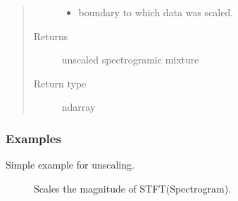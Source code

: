 \documentclass[letterpaper,10pt,english,openany,oneside]{sphinxmanual}
\begin{document}
\begin{fulllineitems}
\begin{fulllineitems}
\begin{quote}
\begin{description}
\begin{itemize}
\item {} 
 \textendash{} boundary to which data was scaled.

\end{itemize}

\item[{Returns}] \leavevmode
unscaled spectrogramic mixture

\item[{Return type}] \leavevmode
ndarray

\end{description}\end{quote}
\subsubsection*{Examples}

Simple example for unscaling.

\begin{sphinxVerbatim}[commandchars=\\\{\}]
  \PYG{p}{[}\PYG{p}{[}    \PYG{p}{]} \PYG{p}{[}    \PYG{p}{]}\PYG{p}{]}
  
 \PYG{p}{[} \PYG{p}{]}
\PYG{g+go}{[[0.         0.68273064 0.851306   0.25795466 1.        ]}
\PYG{g+go}{ [0.         0.25795466 0.         0.         0.48812467]]}
\end{sphinxVerbatim}



\begin{description}
\item[{{\hyperref[\detokenize{docs/source/preprocess:preprocess.preprocess_tools.Scaler.scale}]{}}}] \leavevmode
Scales the magnitude of STFT(Spectrogram).

\end{description}



\end{fulllineitems}


\end{fulllineitems}
\end{document}
